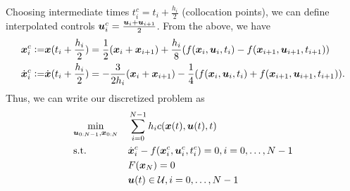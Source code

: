 Choosing intermediate times $t_i^c = t_i + \frac{h_i}{2}$ (collocation points), we can define interpolated controls $\bm{u}^c_i = \frac{\bm{u}_i + \bm{u}_{i+1}}{2}$. From the above, we have
\begin{align}
    \bm{x}^c_i \vcentcolon=& \bm{x}(t_i + \frac{h_i}{2}) = \frac{1}{2} (\bm{x}_i + \bm{x}_{i+1}) + \frac{h_i}{8} (f(\bm{x}_i,\bm{u}_i,t_i) - f(\bm{x}_{i+1},\bm{u}_{i+1},t_{i+1}))\\
    \dot{\bm{x}}^c_i \vcentcolon=& \dot{\bm{x}}(t_i + \frac{h_i}{2}) = -\frac{3}{2h_i} (\bm{x}_i + \bm{x}_{i+1}) - \frac{1}{4} (f(\bm{x}_i,\bm{u}_i,t_i) + f(\bm{x}_{i+1},\bm{u}_{i+1},t_{i+1})).
\end{align}
Thus, we can write our discretized problem as 
\begin{equation}
\begin{aligned}
\label{eq:ocp}
& \underset{\bm{u}_{0:N-1},\bm{x}_{0:N}}{\min} & & \sum_{i=0}^{N-1} h_i c(\bm{x}(t),\bm{u}(t),t)\\
& \textrm{s.t.} & & \dot{\bm{x}}_i^c - f(\bm{x}^c_i, \bm{u}^c_i,t_i^c) = 0, i = 0, \ldots, N-1\\
& & & F(\bm{x}_N) = 0\\
& & & \bm{u}(t) \in \mathcal{U}, i = 0, \ldots, N-1
\end{aligned}
\end{equation}





